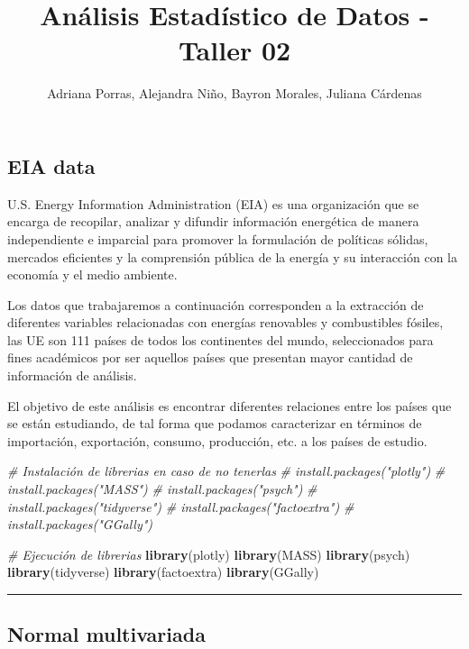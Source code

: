 \documentclass[
]{article}
\title{Análisis Estadístico de Datos - Taller 02}
\author{Adriana Porras, Alejandra Niño, Bayron Morales, Juliana
Cárdenas}
\date{}
\newenvironment{Shaded}{\begin{snugshade}}{\end{snugshade}}
\newcommand{\CommentTok}[1]{\textcolor[rgb]{0.56,0.35,0.01}{\textit{#1}}}
\newcommand{\FunctionTok}[1]{\textcolor[rgb]{0.13,0.29,0.53}{\textbf{#1}}}
\newcommand{\NormalTok}[1]{#1}
\begin{document}
\maketitle

\subsection{EIA data}\label{eia-data}

U.S. Energy Information Administration (EIA) es una organización que se
encarga de recopilar, analizar y difundir información energética de
manera independiente e imparcial para promover la formulación de
políticas sólidas, mercados eficientes y la comprensión pública de la
energía y su interacción con la economía y el medio ambiente.

Los datos que trabajaremos a continuación corresponden a la extracción
de diferentes variables relacionadas con energías renovables y
combustibles fósiles, las UE son 111 países de todos los continentes del
mundo, seleccionados para fines académicos por ser aquellos países que
presentan mayor cantidad de información de análisis.

El objetivo de este análisis es encontrar diferentes relaciones entre
los países que se están estudiando, de tal forma que podamos
caracterizar en términos de importación, exportación, consumo,
producción, etc. a los países de estudio.

\begin{Shaded}
\begin{Highlighting}[]
\CommentTok{\# Instalación de librerias en caso de no tenerlas}
\CommentTok{\# install.packages("plotly")}
\CommentTok{\# install.packages("MASS")}
\CommentTok{\# install.packages("psych")}
\CommentTok{\# install.packages("tidyverse")}
\CommentTok{\# install.packages("factoextra")}
\CommentTok{\# install.packages("GGally")}

\CommentTok{\# Ejecución de librerias}
\FunctionTok{library}\NormalTok{(plotly)}
\FunctionTok{library}\NormalTok{(MASS)}
\FunctionTok{library}\NormalTok{(psych)}
\FunctionTok{library}\NormalTok{(tidyverse)}
\FunctionTok{library}\NormalTok{(factoextra)}
\FunctionTok{library}\NormalTok{(GGally)}
\end{Highlighting}
\end{Shaded}

\begin{center}\rule{0.5\linewidth}{0.5pt}\end{center}

\subsection{Normal multivariada}\label{normal-multivariada}
\end{document}
